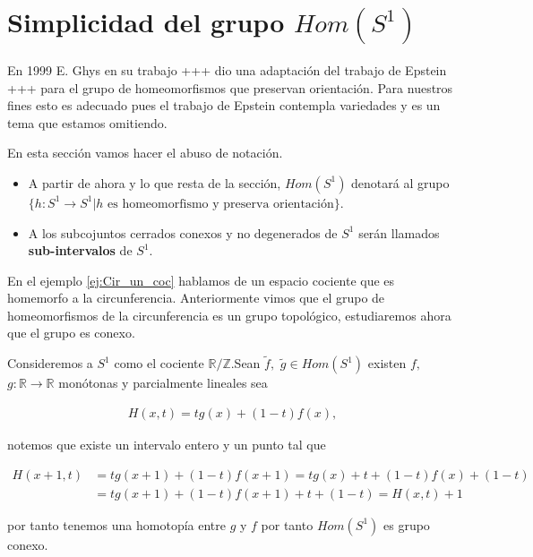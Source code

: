 




	
\section*{Simplicidad del grupo $Hom(S^1)$}

 En 1999 E. Ghys en su trabajo +++ dio una adaptación del trabajo de Epstein +++ para el grupo de homeomorfismos que preservan orientación. Para nuestros fines esto es adecuado pues el trabajo de Epstein contempla variedades y es un tema que estamos omitiendo.
 
 
\begin{cn}
En esta sección vamos hacer el abuso de notación.
	\begin{itemize}
	\item A partir de ahora y lo que resta de la sección, $Hom(S^1)$ denotará al grupo $\{h: S^1 \to S^1 | h \text{ es homeomorfismo y preserva orientación} \}$.
	\item A los subcojuntos cerrados conexos y no degenerados de  $S^1$ serán llamados \textbf{sub-intervalos} de $S^1.$
	\end{itemize}
\end{cn}
 
  En el ejemplo \ref{ej:Cir_un_coc} hablamos de un espacio cociente que es homemorfo a la circunferencia. Anteriormente vimos que el grupo de homeomorfismos de la circunferencia es un grupo topológico, estudiaremos ahora que el grupo es conexo.
  
  Consideremos a $S^1$ como el cociente $\mathbb{R} / \mathbb{Z}$.Sean $\tilde{f},$ $\tilde{g} \in Hom(S^1)$ existen $f,$ $g: \mathbb{R} \to \mathbb{R}$ monótonas y parcialmente lineales sea 

\begin{align*}
H(x,t)=tg(x)+(1-t)f(x),
\end{align*}

notemos que existe un intervalo entero y un punto tal que 

\begin{align*}
H(x+1,t) & = tg(x+1)+(1-t)f(x+1)= tg(x)+t+(1-t)f(x)+(1-t) \\
& = tg(x+1)+(1-t)f(x+1) + t +(1-t)= H(x,t)+1
\end{align*} 

por tanto tenemos una homotopía entre $g$ y $f$ por tanto $Hom(S^1)$ es grupo conexo.

